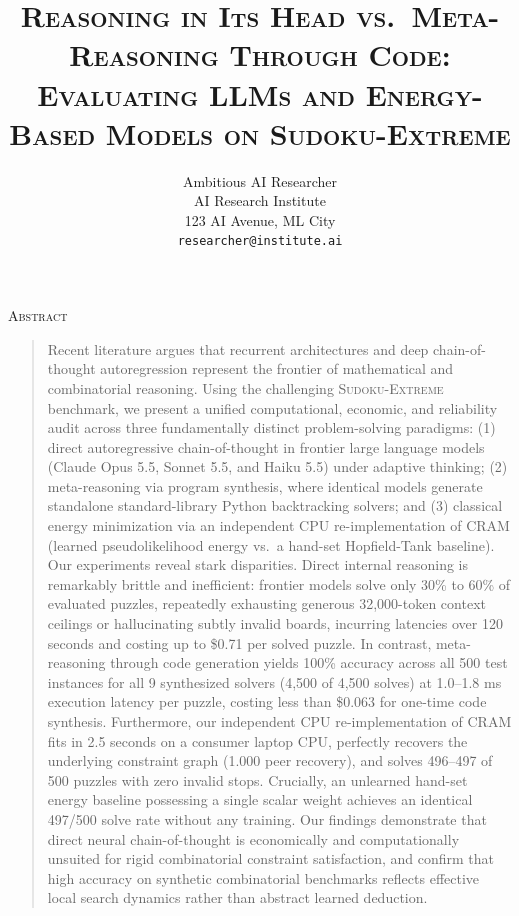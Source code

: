 \documentclass{article} %
\title{\normalfont\fontsize{17}{20}\selectfont\textsc{Reasoning in Its Head vs.\ Meta-Reasoning Through Code: Evaluating LLMs and Energy-Based Models on Sudoku-Extreme}}
\author{Ambitious AI Researcher\\
AI Research Institute\\
123 AI Avenue, ML City\\
\texttt{researcher@institute.ai}
}
\renewenvironment{abstract}{%
  \vskip 0.075in%
  \centerline{\normalfont\fontsize{12}{14}\selectfont\textsc{Abstract}}%
  \vspace{0.5ex}%
  \begin{quote}%
}{%
  \par%
  \end{quote}%
}
\begin{document}
\maketitle

\begin{abstract}
Recent literature argues that recurrent architectures and deep chain-of-thought autoregression represent the frontier of mathematical and combinatorial reasoning. Using the challenging \textsc{Sudoku-Extreme} benchmark, we present a unified computational, economic, and reliability audit across three fundamentally distinct problem-solving paradigms: (1) direct autoregressive chain-of-thought in frontier large language models (Claude Opus 5.5, Sonnet 5.5, and Haiku 5.5) under adaptive thinking; (2) meta-reasoning via program synthesis, where identical models generate standalone standard-library Python backtracking solvers; and (3) classical energy minimization via an independent CPU re-implementation of CRAM (learned pseudolikelihood energy vs.\ a hand-set Hopfield-Tank baseline). Our experiments reveal stark disparities. Direct internal reasoning is remarkably brittle and inefficient: frontier models solve only 30\% to 60\% of evaluated puzzles, repeatedly exhausting generous 32,000-token context ceilings or hallucinating subtly invalid boards, incurring latencies over 120 seconds and costing up to \$0.71 per solved puzzle. In contrast, meta-reasoning through code generation yields 100\% accuracy across all 500 test instances for all 9 synthesized solvers (4,500 of 4,500 solves) at 1.0--1.8 ms execution latency per puzzle, costing less than \$0.063 for one-time code synthesis. Furthermore, our independent CPU re-implementation of CRAM fits in 2.5 seconds on a consumer laptop CPU, perfectly recovers the underlying constraint graph (1.000 peer recovery), and solves 496--497 of 500 puzzles with zero invalid stops. Crucially, an unlearned hand-set energy baseline possessing a single scalar weight achieves an identical 497/500 solve rate without any training. Our findings demonstrate that direct neural chain-of-thought is economically and computationally unsuited for rigid combinatorial constraint satisfaction, and confirm that high accuracy on synthetic combinatorial benchmarks reflects effective local search dynamics rather than abstract learned deduction.
\end{abstract}
\end{document}

